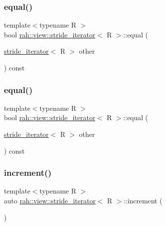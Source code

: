 \subsubsection{\texorpdfstring{equal()}{equal()}\hspace{0.1cm}{\footnotesize\ttfamily [1/2]}}
{\footnotesize\ttfamily template$<$typename R $>$ \\
bool \mbox{\hyperlink{structrah_1_1view_1_1stride__iterator}{rah\+::view\+::stride\+\_\+iterator}}$<$ R $>$\+::equal (\begin{DoxyParamCaption}\item[{\mbox{\hyperlink{structrah_1_1view_1_1stride__iterator}{stride\+\_\+iterator}}$<$ R $>$}]{other }\end{DoxyParamCaption}) const\hspace{0.3cm}{\ttfamily [inline]}}

\mbox{\label{structrah_1_1view_1_1stride__iterator_a34c24e935ee7beebcd7269ee314e245a}} 
\subsubsection{\texorpdfstring{equal()}{equal()}\hspace{0.1cm}{\footnotesize\ttfamily [2/2]}}
{\footnotesize\ttfamily template$<$typename R $>$ \\
bool \mbox{\hyperlink{structrah_1_1view_1_1stride__iterator}{rah\+::view\+::stride\+\_\+iterator}}$<$ R $>$\+::equal (\begin{DoxyParamCaption}\item[{\mbox{\hyperlink{structrah_1_1view_1_1stride__iterator}{stride\+\_\+iterator}}$<$ R $>$}]{other }\end{DoxyParamCaption}) const\hspace{0.3cm}{\ttfamily [inline]}}

\mbox{\label{structrah_1_1view_1_1stride__iterator_ae98465362884b064db4184a406221154}} 
\subsubsection{\texorpdfstring{increment()}{increment()}\hspace{0.1cm}{\footnotesize\ttfamily [1/2]}}
{\footnotesize\ttfamily template$<$typename R $>$ \\
auto \mbox{\hyperlink{structrah_1_1view_1_1stride__iterator}{rah\+::view\+::stride\+\_\+iterator}}$<$ R $>$\+::increment (\begin{DoxyParamCaption}{ }\end{DoxyParamCaption})\hspace{0.3cm}{\ttfamily [inline]}}

